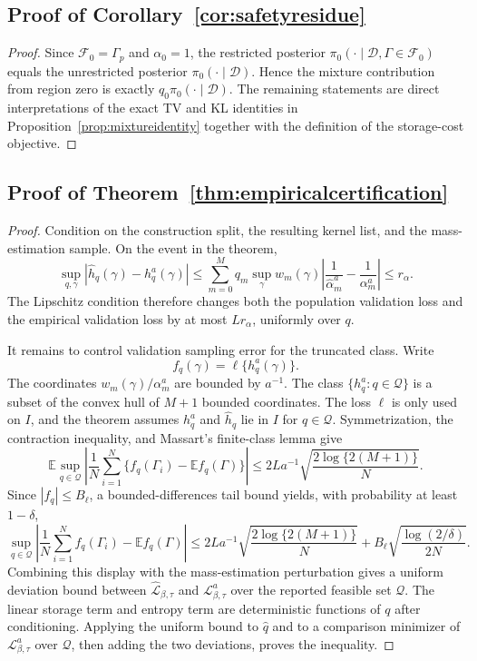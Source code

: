 \documentclass[twoside,11pt]{article}
\newcommand{\D}{\mathcal{D}}
\newcommand{\F}{\mathcal{F}}
\newcommand{\E}{\mathbb{E}}
\begin{document}
\subsection{Proof of Corollary~\ref{cor:safetyresidue}}

\begin{proof} Since \(\F_0=\Gamma_p\) and \(\alpha_0=1\), the restricted posterior \(\pi_0(\cdot\mid\D,\Gamma\in\F_0)\) equals the unrestricted posterior \(\pi_0(\cdot\mid\D)\). Hence the mixture contribution from region zero is exactly \(q_0\pi_0(\cdot\mid\D)\). The remaining statements are direct interpretations of the exact TV and KL identities in Proposition~\ref{prop:mixtureidentity} together with the definition of the storage-cost objective.
\end{proof}

\subsection{Proof of Theorem~\ref{thm:empiricalcertification}}

\begin{proof} Condition on the construction split, the resulting kernel list, and the mass-estimation sample. On the event in the theorem,
\[
\sup_{q,\gamma} |\widehat h_q(\gamma)-h_q^a(\gamma)| \le \sum_{m=0}^M q_m \sup_\gamma w_m(\gamma) \left| \frac1{\widehat\alpha_m^a} - \frac1{\alpha_m^a} \right| \le r_\alpha.
\]
The Lipschitz condition therefore changes both the population validation loss and the empirical validation loss by at most $Lr_\alpha$, uniformly over $q$.

It remains to control validation sampling error for the truncated class. Write
\[
f_q(\gamma)=\ell\{h_q^a(\gamma)\}.
\]
The coordinates \(w_m(\gamma)/\alpha_m^a\) are bounded by \(a^{-1}\). The class \(\{h_q^a:q\in\mathcal Q\}\) is a subset of the convex hull of \(M+1\) bounded coordinates. The loss \(\ell\) is only used on \(I\), and the theorem assumes \(h_q^a\) and \(\widehat h_q\) lie in \(I\) for \(q\in\mathcal Q\). Symmetrization, the contraction inequality, and Massart's finite-class lemma give
\[
\E\sup_{q\in\mathcal Q} \left| \frac1N\sum_{i=1}^N \{f_q(\Gamma_i)-\E f_q(\Gamma)\} \right| \le 2La^{-1}\sqrt{\frac{2\log\{2(M+1)\}}{N}}.
\]
Since $|f_q|\le B_\ell$, a bounded-differences tail bound yields, with probability at least $1-\delta$,
\[
\sup_{q\in\mathcal Q} \left| \frac1N\sum_{i=1}^N f_q(\Gamma_i) - \E f_q(\Gamma) \right| \le 2La^{-1}\sqrt{\frac{2\log\{2(M+1)\}}{N}} + B_\ell\sqrt{\frac{\log(2/\delta)}{2N}}.
\]
Combining this display with the mass-estimation perturbation gives a uniform deviation bound between \(\widehat{\mathcal L}_{\beta,\tau}\) and \(\mathcal L_{\beta,\tau}^a\) over the reported feasible set \(\mathcal Q\). The linear storage term and entropy term are deterministic functions of \(q\) after conditioning. Applying the uniform bound to \(\widehat q\) and to a comparison minimizer of \(\mathcal L_{\beta,\tau}^a\) over \(\mathcal Q\), then adding the two deviations, proves the inequality.
\end{proof}
\end{document}
